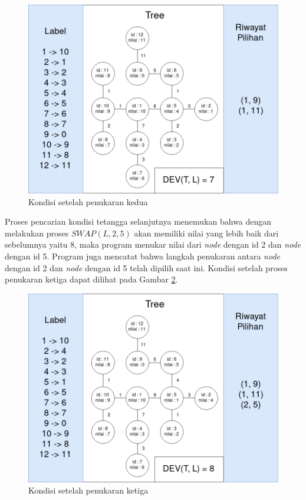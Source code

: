 \begin{figure}[ht]
	\centering\includegraphics[width=1\textwidth]{bab5/figures/uji_coba_3.png}
	\caption{Kondisi setelah penukaran kedua}
	\label{fig:uji_coba_3}
\end{figure}

Proses pencarian kondisi tetangga selanjutnya menemukan bahwa dengan melakukan proses $ SWAP(L, 2, 5) $ akan memiliki nilai yang lebih baik dari sebelumnya yaitu 8, maka program menukar nilai dari \textit{node} dengan id 2 dan \textit{node} dengan id 5. Program juga mencatat bahwa langkah penukaran antara \textit{node} dengan id 2 dan \textit{node} dengan id 5 telah dipilih saat ini. Kondisi setelah proses penukaran ketiga dapat dilihat pada Gambar \ref{fig:uji_coba_4}.

\begin{figure}[ht]
	\centering\includegraphics[width=1\textwidth]{bab5/figures/uji_coba_4.png}
	\caption{Kondisi setelah penukaran ketiga}
	\label{fig:uji_coba_4}
\end{figure}


